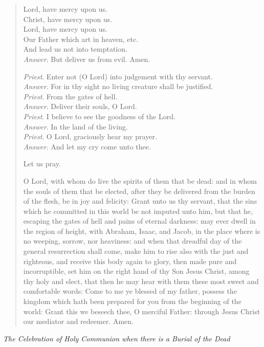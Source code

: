 \documentclass[
]{book}
\begin{document}
\begin{quote}
Lord, have mercy upon us.\\
Christ, have mercy upon us.\\
Lord, have mercy upon us.\\
Our Father which art in heaven, etc.\\
And lead us not into temptation.\\
\emph{Answer}. But deliver us from evil. Amen.

\emph{Priest}. Enter not (O Lord) into judgement with thy servant.\\
\emph{Answer}. For in thy sight no living creature shall be justified.\\
\emph{Priest}. From the gates of hell.\\
\emph{Answer}. Deliver their souls, O Lord.\\
\emph{Priest}. I believe to see the goodness of the Lord.\\
\emph{Answer}. In the land of the living.\\
\emph{Priest}. O Lord, graciously hear my prayer.\\
\emph{Answer}. And let my cry come unto thee.

Let us pray.

O Lord, with whom do live the spirits of them that be dead: and in whom the souls of them that be elected, after they be delivered from the burden of the flesh, be in joy and felicity: Grant unto us thy servant, that the sins which he committed in this world be not imputed unto him, but that he, escaping the gates of hell and pains of eternal darkness: may ever dwell in the region of height, with Abraham, Isaac, and Jacob, in the place where is no weeping, sorrow, nor heaviness: and when that dreadful day of the general resurrection shall come, make him to rise also with the just and righteous, and receive this body again to glory, then made pure and incorruptible, set him on the right hand of thy Son Jesus Christ, among thy holy and elect, that then he may hear with them these most sweet and comfortable words: Come to me ye blessed of my father, possess the kingdom which hath been prepared for you from the beginning of the world: Grant this we beseech thee, O merciful Father: through Jesus Christ our mediator and redeemer. Amen.
\end{quote}

\begin{center}
\emph{The Celebration of Holy Communion when there is a Burial of the Dead}

\end{center}
\end{document}
